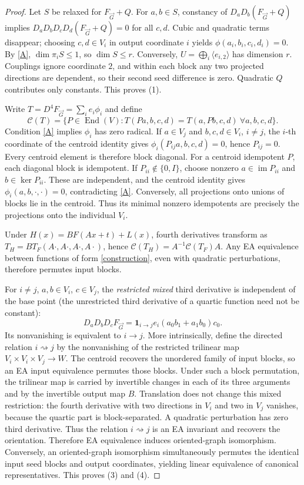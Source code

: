 \documentclass[11pt]{article}
\begin{document}
\begin{proof}
Let $S$ be relaxed for $F_{\vec G}+Q$. For $a,b\in S$, constancy of $D_aD_b(F_{\vec G}+Q)$ implies $D_aD_bD_cD_d(F_{\vec G}+Q)=0$ for all $c,d$. Cubic and quadratic terms disappear; choosing $c,d\in V_i$ in output coordinate $i$ yields $\phi(a_i,b_i,c_i,d_i)=0$. By \eqref{A}, $\dim\pi_i S\le1$, so $\dim S\le r$. Conversely, $U=\bigoplus_i\langle e_{i,2}\rangle$ has dimension $r$. Couplings ignore coordinate $2$, and within each block any two projected directions are dependent, so their second seed difference is zero. Quadratic $Q$ contributes only constants. This proves (1).

Write $T=D^4F_{\vec G}=\sum_i e_i\phi_i$ and define
\[
\mathcal C(T)=\{P\in\operatorname{End}(V):T(Pa,b,c,d)=T(a,Pb,c,d)\ \forall a,b,c,d\}.
\]
Condition \eqref{A} implies $\phi_i$ has zero radical. If $a\in V_j$ and $b,c,d\in V_i$, $i\ne j$, the $i$-th coordinate of the centroid identity gives $\phi_i(P_{ij}a,b,c,d)=0$, hence $P_{ij}=0$. Every centroid element is therefore block diagonal. For a centroid idempotent $P$, each diagonal block is idempotent. If $P_{ii}\notin\{0,I\}$, choose nonzero $a\in\operatorname{im}P_{ii}$ and $b\in\ker P_{ii}$. These are independent, and the centroid identity gives $\phi_i(a,b,\cdot,\cdot)=0$, contradicting \eqref{A}. Conversely, all projections onto unions of blocks lie in the centroid. Thus its minimal nonzero idempotents are precisely the projections onto the individual $V_i$.

Under $H(x)=B F(Ax+t)+L(x)$, fourth derivatives transform as $T_H=B T_F(A\cdot,A\cdot,A\cdot,A\cdot)$, hence $\mathcal C(T_H)=A^{-1}\mathcal C(T_F)A$. Any EA equivalence between functions of form \eqref{construction}, even with quadratic perturbations, therefore permutes input blocks.

For $i\ne j$, $a,b\in V_i$, $c\in V_j$, the \emph{restricted mixed} third derivative is independent of the base point (the unrestricted third derivative of a quartic function need not be constant):
\[
D_aD_bD_cF_{\vec G}
=\mathbf1_{i\to j}e_i(a_0b_1+a_1b_0)c_0.
\]
Its nonvanishing is equivalent to $i\to j$. More intrinsically, define the directed relation $i\rightsquigarrow j$ by the nonvanishing of the restricted trilinear map $V_i\times V_i\times V_j\to W$. The centroid recovers the unordered family of input blocks, so an EA input equivalence permutes those blocks. Under such a block permutation, the trilinear map is carried by invertible changes in each of its three arguments and by the invertible output map $B$. Translation does not change this mixed restriction: the fourth derivative with two directions in $V_i$ and two in $V_j$ vanishes, because the quartic part is block-separated. A quadratic perturbation has zero third derivative. Thus the relation $i\rightsquigarrow j$ is an EA invariant and recovers the orientation. Therefore EA equivalence induces oriented-graph isomorphism. Conversely, an oriented-graph isomorphism simultaneously permutes the identical input seed blocks and output coordinates, yielding linear equivalence of canonical representatives. This proves (3) and (4).


\end{proof}
\end{document}
